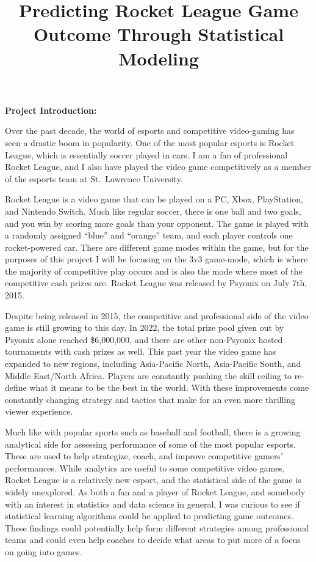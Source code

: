 \documentclass[
  letterpaper,
  DIV=11,
  numbers=noendperiod]{scrartcl}
\title{Predicting Rocket League Game Outcome Through Statistical
Modeling}
\author{}
\date{}
\begin{document}
\maketitle
\ifdefined\Shaded\renewenvironment{Shaded}{\begin{tcolorbox}[sharp corners, enhanced, frame hidden, interior hidden, borderline west={3pt}{0pt}{shadecolor}, boxrule=0pt, breakable]}{\end{tcolorbox}}\fi

\linenumbers

\textbf{Project Introduction:}

Over the past decade, the world of esports and competitive video-gaming
has seen a drastic boom in popularity. One of the most popular esports
is Rocket League, which is essentially soccer played in cars. I am a fan
of professional Rocket League, and I also have played the video game
competitively as a member of the esports team at St.~Lawrence
University.

Rocket League is a video game that can be played on a PC, Xbox,
PlayStation, and Nintendo Switch. Much like regular soccer, there is one
ball and two goals, and you win by scoring more goals than your
opponent. The game is played with a randomly assigned ``blue'' and
``orange'' team, and each player controls one rocket-powered car. There
are different game modes within the game, but for the purposes of this
project I will be focusing on the 3v3 game-mode, which is where the
majority of competitive play occurs and is also the mode where most of
the competitive cash prizes are. Rocket League was released by Psyonix
on July 7th, 2015.

Despite being released in 2015, the competitive and professional side of
the video game is still growing to this day. In 2022, the total prize
pool given out by Psyonix alone reached \$6,000,000, and there are other
non-Psyonix hosted tournaments with cash prizes as well. This past year
the video game has expanded to new regions, including Asia-Pacific
North, Asia-Pacific South, and Middle East/North Africa. Players are
constantly pushing the skill ceiling to re-define what it means to be
the best in the world. With these improvements come constantly changing
strategy and tactics that make for an even more thrilling viewer
experience.

Much like with popular sports such as baseball and football, there is a
growing analytical side for assessing performance of some of the most
popular esports. These are used to help strategize, coach, and improve
competitive gamers' performances. While analytics are useful to some
competitive video games, Rocket League is a relatively new esport, and
the statistical side of the game is widely unexplored. As both a fan and
a player of Rocket League, and somebody with an interest in statistics
and data science in general, I was curious to see if statistical
learning algorithms could be applied to predicting game outcomes. These
findings could potentially help form different strategies among
professional teams and could even help coaches to decide what areas to
put more of a focus on going into games.
\end{document}
